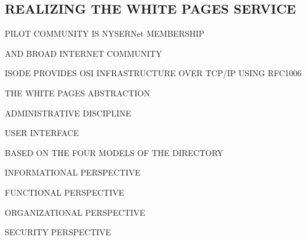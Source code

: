 \begin{bwslide}
\part*	{REALIZING THE WHITE PAGES SERVICE}\bf

\begin{nrtc}
\item	PILOT COMMUNITY IS NYSERNet MEMBERSHIP
    \begin{nrtc}
    \item	AND BROAD INTERNET COMMUNITY
    \end{nrtc}

\item	ISODE PROVIDES OSI INFRASTRUCTURE OVER TCP/IP USING RFC1006

\item	THE WHITE PAGES ABSTRACTION
    \begin{nrtc}
    \item	ADMINISTRATIVE DISCIPLINE

    \item	USER INTERFACE
    \end{nrtc}
\end{nrtc}
\end{bwslide}


\begin{bwslide}

\begin{nrtc}
\item	BASED ON THE FOUR MODELS OF THE DIRECTORY
    \begin{nrtc}
    \item	INFORMATIONAL PERSPECTIVE

    \item	FUNCTIONAL PERSPECTIVE

    \item	ORGANIZATIONAL PERSPECTIVE

    \item	SECURITY PERSPECTIVE
    \end{nrtc}
\end{nrtc}
\end{bwslide}


